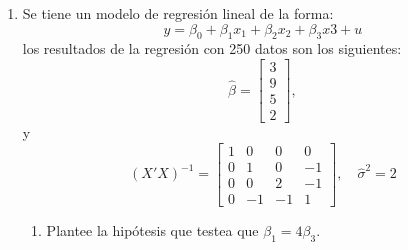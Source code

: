 \documentclass[10pt,a4paper]{article}
\begin{document}
\begin{enumerate}
{\begin{enumerate}
\[                  \left[
                    2.7 - 1.97 \times 0.9;
                    2.7 + 1.97 \times 0.9
                  \right]
                  =
                  \left[
                    0.927; 4.473
                  \right].\]
            
                \textbf{Interpretación:} Con 95\% de confianza, se espera que
                el efecto parcial de \( X_1 \) sobre la variable dependiente
                esté entre 0.927 y 4.473 unidades. Es decir, un aumento en
                \( X_1 \) está asociado, en promedio, a un aumento positivo y
                significativo en la variable dependiente.


                \item \textbf{Hipótesis:}
\begin{itemize}
    \item Hipótesis nula (\( H_0 \)): \( \beta_1 =0  \)
    \item Hipótesis alternativa (\( H_1 \)): \( \beta_1 > 0 \)
\end{itemize}

Esto corresponde a una prueba unilateral a la derecha para el parámetro \( \beta_1 \).

Supongamos que al estimar el modelo se obtiene:
\[
\hat{\beta}_1 = 2{,}7 \quad \text{y} \quad \text{error estándar} = 0{,}8
\]

El estadístico de prueba es:
\[
 t = \frac{2{,}7}{0{,}9} = 3
\]

Con un nivel de significancia del 5\% y usando una prueba unilateral, se compara este valor con   $t_{5\%}=1.65$.

Como el estadístico t> 1.65, existe evidencia estadística suficiente para concluir que la variable dependiente es creciente respecto de \( x_1 \).
        \end{enumerate}}

\item Se tiene un modelo de regresión lineal de la forma:
$$y=\beta_0 + \beta_1 x_1+\beta_2x_2+\beta_3 x3 + u$$
los resultados de la regresión con 250 datos son los siguientes:
        \[
          \hat{\beta} = \begin{bmatrix} 3 \\ 9 \\ 5 \\2 \end{bmatrix},
        \]
y 
        \[
          (X'X)^{-1} =
          \begin{bmatrix}
1 & 0  & 0  &  0\\
0 & 1  & 0  & -1\\
0 & 0  & 2  & -1\\
0 & -1 & -1 &  1
\end{bmatrix},
          \quad \hat{\sigma}^2 = 2
        \]
\begin{enumerate}
    \item Plantee la hipótesis que testea que $\beta_1=4\beta_3$.


\end{enumerate}
\end{enumerate}
\end{document}
